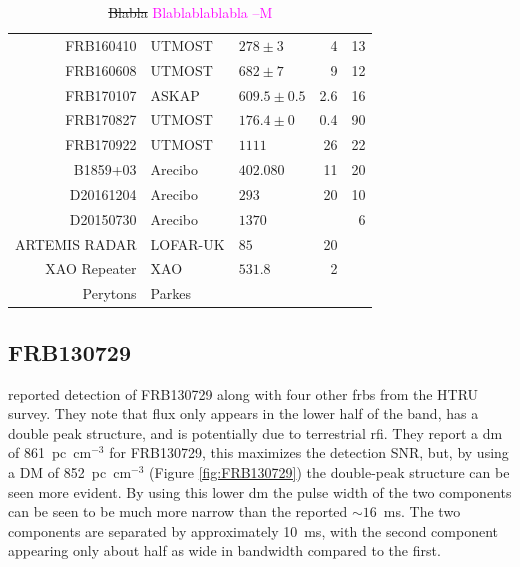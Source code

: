 \documentclass[a4paper,fleqn,usenatbib]{mnras}
\newcommand{\cM}[1]{\textcolor{magenta}{ #1 --M}}
\begin{document}
\begin{table}
\begin{tabular}{ r l l r r }
FRB160410 & UTMOST  & $278 \pm 3$        &  4		&	13   \\ 
FRB160608 & UTMOST  & $682 \pm 7$        &  9		&	12   \\ 
FRB170107 & ASKAP   & $609.5 \pm 0.5$    &  2.6		&	16   \\ 
FRB170827 & UTMOST  & $176.4 \pm 0$      &  0.4		&	90   \\ 
FRB170922 & UTMOST  & $1111$             &  26		&	22   \\
\hline
B1859+03  & Arecibo & $402.080$          &  11      &   20   \\ %
D20161204 & Arecibo & $293$              &  20      &   10   \\
D20150730 & Arecibo & $1370$             &          &    6   \\
ARTEMIS RADAR & LOFAR-UK & $85$          &  20      &        \\
XAO Repeater & XAO  & $531.8$            &  2       &        \\
Perytons  & Parkes  &                    &          &        \\
\end{tabular}
\caption{\sout{Blabla}\cM{Blablablablabla}}
\label{tbl:frbs}
\end{table}

\subsection{FRB130729}

\cite{2016MNRAS.460L..30C} reported detection of FRB130729 along with four other
\glspl{frb} from the HTRU survey. They note that flux only appears in the lower
half of the band, has a double peak structure, and is potentially due to
terrestrial \gls{rfi}.  They report a \gls{dm} of 861~pc~cm$^{-3}$ for
FRB130729, this maximizes the detection SNR, but, by using a DM of
852~pc~cm$^{-3}$ (Figure \ref{fig:FRB130729}) the double-peak structure can be
seen more evident. By using this lower \gls{dm} the pulse width of the two
components can be seen to be much more narrow than the reported $\sim 16$~ms.
The two components are separated by approximately 10~ms, with the second
component appearing only about half as wide in bandwidth compared to the first. 
\end{document}
